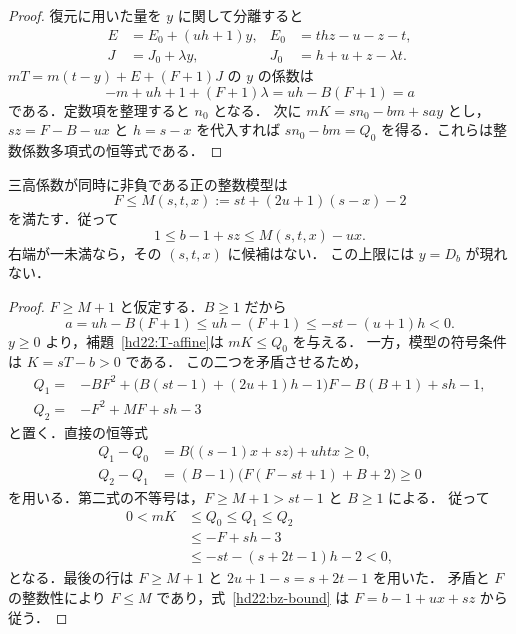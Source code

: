 \begin{proof}
復元に用いた量を $y$ に関して分離すると
\[
 \begin{aligned}
 E&=E_0+(uh+1)y,& E_0&=thz-u-z-t,\\
 J&=J_0+\lambda y,& J_0&=h+u+z-\lambda t.
 \end{aligned}
\]
$mT=m(t-y)+E+(F+1)J$ の $y$ の係数は
\[
 -m+uh+1+(F+1)\lambda=uh-B(F+1)=a
\]
である．定数項を整理すると $n_0$ となる．
次に $mK=sn_0-bm+say$ とし，$sz=F-B-ux$ と $h=s-x$ を代入すれば
$sn_0-bm=Q_0$ を得る．これらは整数係数多項式の恒等式である．
\end{proof}

\begin{theorem}[低行ごとの $F$ 上限]
\label{hd22:F-bound}
三高係数が同時に非負である正の整数模型は
\begin{equation}\label{hd22:M-bound}
 F\le M(s,t,x):=st+(2u+1)(s-x)-2
\end{equation}
を満たす．従って
\begin{equation}\label{hd22:bz-bound}
 1\le b-1+sz\le M(s,t,x)-ux.
\end{equation}
右端が一未満なら，その $(s,t,x)$ に候補はない．
この上限には $y=D_b$ が現れない．
\end{theorem}

\begin{proof}
$F\ge M+1$ と仮定する．$B\ge1$ だから
\[
 a=uh-B(F+1)\le uh-(F+1)
 \le -st-(u+1)h<0.
\]
$y\ge0$ より，補題~\ref{hd22:T-affine}は $mK\le Q_0$ を与える．
一方，模型の符号条件は $K=sT-b>0$ である．
この二つを矛盾させるため，
\[
 \begin{aligned}
 Q_1={}&-BF^2+
 \bigl(B(st-1)+(2u+1)h-1\bigr)F
 -B(B+1)+sh-1,\\
 Q_2={}&-F^2+MF+sh-3
 \end{aligned}
\]
と置く．直接の恒等式
\begin{align}
 Q_1-Q_0&=B\bigl((s-1)x+sz\bigr)+uhtx\ge0,
 \label{hd22:bound-gap1}\\
 Q_2-Q_1&=(B-1)\bigl(F(F-st+1)+B+2\bigr)\ge0
 \label{hd22:bound-gap2}
\end{align}
を用いる．第二式の不等号は，$F\ge M+1>st-1$ と $B\ge1$ による．
従って
\[
 \begin{aligned}
 0<mK&\le Q_0\le Q_1\le Q_2\\
 &\le -F+sh-3\\
 &\le -st-(s+2t-1)h-2<0,
 \end{aligned}
\]
となる．最後の行は $F\ge M+1$ と $2u+1-s=s+2t-1$ を用いた．
矛盾と $F$ の整数性により $F\le M$ であり，式~\eqref{hd22:bz-bound} は
$F=b-1+ux+sz$ から従う．
\end{proof}

